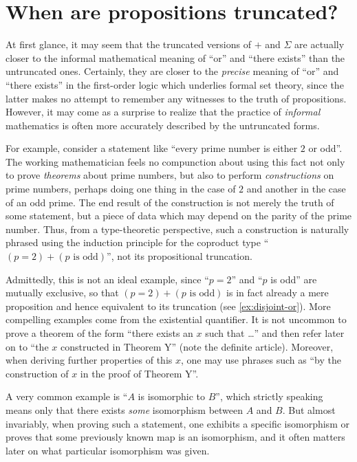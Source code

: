 %


\section{When are propositions truncated?}
\label{subsec:when-trunc}

%
%
%

At first glance, it may seem that the truncated versions of $+$ and $\Sigma$ are actually closer to the informal mathematical meaning of ``or'' and ``there exists'' than the untruncated ones.
Certainly, they are closer to the \emph{precise} meaning of ``or'' and ``there exists'' in the first-order logic  which underlies formal set theory, since the latter makes no attempt to remember any witnesses to the truth of propositions.
However, it may come as a surprise to realize that the practice of \emph{informal} mathematics is often more accurately described by the untruncated forms.

%
For example, consider a statement like ``every prime number is either $2$ or odd''.
The working mathematician feels no compunction about using this fact not only to prove \emph{theorems} about prime numbers, but also to perform \emph{constructions} on prime numbers, perhaps doing one thing in the case of $2$ and another in the case of an odd prime.
The end result of the construction is not merely the truth of some statement, but a piece of data which may depend on the parity of the prime number.
Thus, from a type-theoretic perspective, such a construction is naturally phrased using the induction principle for the coproduct type ``$(p=2)+(p\text{ is odd})$'', not its propositional truncation.

Admittedly, this is not an ideal example, since ``$p=2$'' and ``$p$ is odd'' are mutually exclusive, so that $(p=2)+(p\text{ is odd})$ is in fact already a mere proposition and hence equivalent to its truncation (see \autoref{ex:disjoint-or}).
More compelling examples come from the existential quantifier.
It is not uncommon to prove a theorem of the form ``there exists an $x$ such that \dots'' and then refer later on to ``the $x$ constructed in Theorem Y'' (note the definite article).
Moreover, when deriving further properties of this $x$, one may use phrases such as ``by the construction of $x$ in the proof of Theorem Y''.

A very common example is ``$A$ is isomorphic to $B$'', which strictly speaking means only that there exists \emph{some} isomorphism between $A$ and $B$.
But almost invariably, when proving such a statement, one exhibits a specific isomorphism or proves that some previously known map is an isomorphism, and it often matters later on what particular isomorphism was given.

